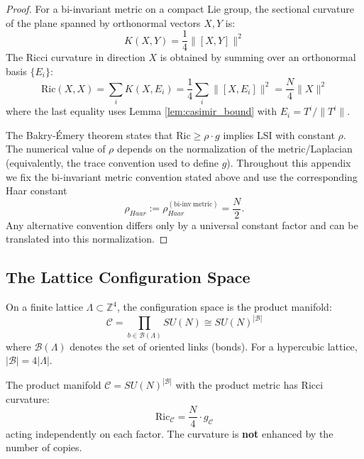 \begin{proof}
For a bi-invariant metric on a compact Lie group, the sectional curvature of the plane spanned by orthonormal vectors $X, Y$ is:
\begin{equation}
    K(X,Y) = \frac{1}{4}\|[X,Y]\|^2
\end{equation}
The Ricci curvature in direction $X$ is obtained by summing over an orthonormal basis $\{E_i\}$:
\begin{equation}
    \text{Ric}(X,X) = \sum_{i} K(X, E_i) = \frac{1}{4} \sum_i \|[X, E_i]\|^2 = \frac{N}{4} \|X\|^2
\end{equation}
where the last equality uses Lemma \ref{lem:casimir_bound} with $E_i = T^i / \|T^i\|$.

The Bakry-Émery theorem states that $\text{Ric} \geq \rho \cdot g$ implies LSI with constant $\rho$.
The numerical value of $\rho$ depends on the normalization of the metric/Laplacian (equivalently, the trace convention used to define $g$). Throughout this appendix we fix the bi-invariant metric convention stated above and use the corresponding Haar constant
\begin{equation}
    \rho_{Haar} := \rho_{Haar}^{(\mathrm{bi\mbox{-}inv\ metric})} = \frac{N}{2}.
\end{equation}
Any alternative convention differs only by a universal constant factor and can be translated into this normalization.
\end{proof}

\subsection{The Lattice Configuration Space}

\begin{definition}
On a finite lattice $\Lambda \subset \mathbb{Z}^4$, the configuration space is the product manifold:
\begin{equation}
    \mathcal{C} = \prod_{b \in \mathcal{B}(\Lambda)} SU(N) \cong SU(N)^{|\mathcal{B}|}
\end{equation}
where $\mathcal{B}(\Lambda)$ denotes the set of oriented links (bonds). For a hypercubic lattice, $|\mathcal{B}| = 4|\Lambda|$.
\end{definition}

\begin{lemma}\label{lem:product_curvature}
The product manifold $\mathcal{C} = SU(N)^{|\mathcal{B}|}$ with the product metric has Ricci curvature:
\begin{equation}
    \text{Ric}_{\mathcal{C}} = \frac{N}{4} \cdot g_{\mathcal{C}}
\end{equation}
acting independently on each factor. The curvature is \textbf{not} enhanced by the number of copies.
\end{lemma}


